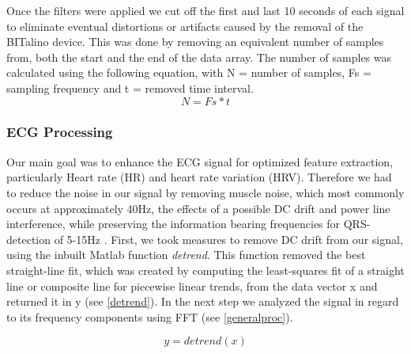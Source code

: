Once the filters were applied we cut off the first and last 10 seconds of each signal to eliminate eventual distortions or artifacts caused by the removal of the BITalino device. This was done by removing an equivalent number of samples from, both the start and the end of the data array. The number of samples was calculated using the following equation, with N = number of samples, Fs = sampling frequency and t = removed time interval.
%
\begin{equation}\label{NumberSamples}
N = Fs * t
\end{equation} 

\subsubsection{ECG Processing}
Our main goal was to enhance the ECG signal for optimized feature extraction, particularly Heart rate (HR) and heart rate variation (HRV). %
Therefore we had to reduce the noise in our signal by removing muscle noise, which most commonly occurs at approximately 40Hz, the effects of a possible DC drift and power line interference, while preserving the information bearing frequencies for QRS-detection of 5-15Hz \cite{PANTOM1985} \cite{tan2013digital}. First, we took measures to remove DC drift from our signal, using the inbuilt Matlab function \textit{detrend}. This function removed the best straight-line fit, which was created by computing the least-squares fit of a straight line or composite line for piecewise linear trends, from the data vector x and returned it in y (see \ref{detrend}). In the next step we analyzed the signal in regard to its frequency components using FFT (see \ref{generalproc}).

\begin{equation}\label{detrend}
y = detrend(x)
\end{equation}

